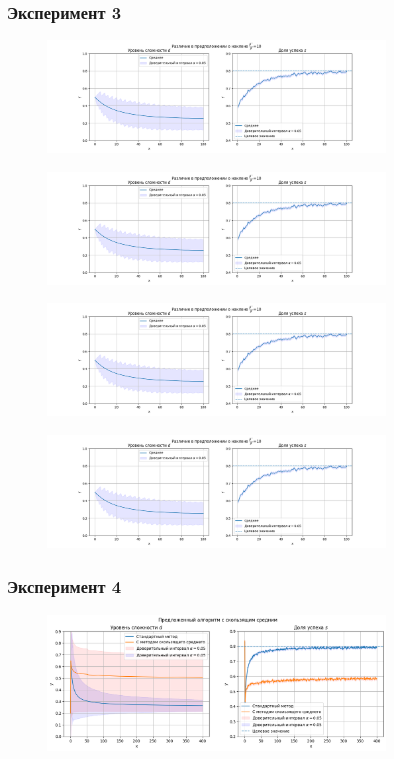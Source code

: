 \documentclass{mipt-thesis-bs}
\begin{document}
\subsubsection{Эксперимент 3}
\begin{figure}[h!]
    \centering
    \includegraphics[width=0.8\textwidth]{assets/3/0.png}
    \label{exp3:10}
\end{figure}
\begin{figure}[h!]
    \centering
    \includegraphics[width=0.8\textwidth]{assets/3/0.png}
    \label{exp3:2_5}
\end{figure}
\begin{figure}[h!]
    \centering
    \includegraphics[width=0.8\textwidth]{assets/3/0.png}
    \label{exp3:1}
\end{figure}
\begin{figure}[h!]
    \centering
    \includegraphics[width=0.8\textwidth]{assets/3/0.png}
    \label{exp3:_0.25}
\end{figure}
\pagebreak
\subsubsection{Эксперимент 4}
\begin{figure}[h!]
    \centering
    \includegraphics[width=0.8\textwidth]{assets/4/adaptive.png}
    \label{exp4:algo}
\end{figure}
\end{document}
